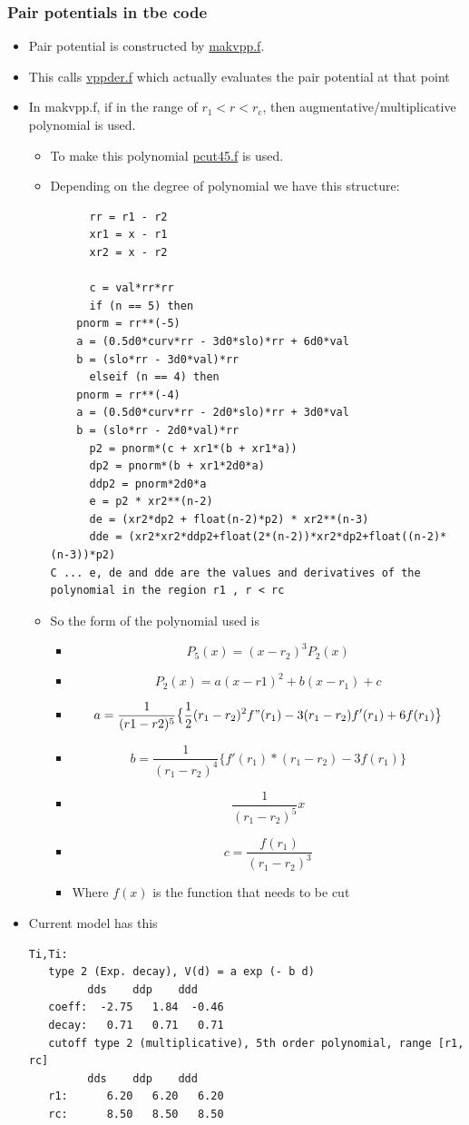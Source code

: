 \documentclass[11pt]{article}
\begin{document}
\subsubsection{Pair potentials in tbe code}
\label{sec-2-2-1}
\begin{itemize}
\item Pair potential is constructed by \href{file:///home/tigany/lm/tb/makvpp.f}{makvpp.f}.
\item This calls \href{file:///home/tigany/lm/tb/vppder.f}{vppder.f} which actually evaluates the pair potential at that
point
\item In makvpp.f, if in the range of $r_1 < r < r_{\text{c}}$, then
augmentative/multiplicative polynomial is used.
\begin{itemize}
\item To make this polynomial \href{file:///home/tigany/lm/tb/pcut45.f}{pcut45.f} is used.
\item Depending on the degree of polynomial we have this structure:
\begin{verbatim}
      rr = r1 - r2
      xr1 = x - r1
      xr2 = x - r2

      c = val*rr*rr
      if (n == 5) then
	pnorm = rr**(-5)
	a = (0.5d0*curv*rr - 3d0*slo)*rr + 6d0*val
	b = (slo*rr - 3d0*val)*rr
      elseif (n == 4) then
	pnorm = rr**(-4)
	a = (0.5d0*curv*rr - 2d0*slo)*rr + 3d0*val
	b = (slo*rr - 2d0*val)*rr
      p2 = pnorm*(c + xr1*(b + xr1*a))
      dp2 = pnorm*(b + xr1*2d0*a)
      ddp2 = pnorm*2d0*a
      e = p2 * xr2**(n-2)
      de = (xr2*dp2 + float(n-2)*p2) * xr2**(n-3)
      dde = (xr2*xr2*ddp2+float(2*(n-2))*xr2*dp2+float((n-2)*(n-3))*p2)
C ... e, de and dde are the values and derivatives of the polynomial in the region r1 , r < rc
\end{verbatim}
\item So the form of the polynomial used is
\begin{itemize}
\item $$ P_5(x) = (x-r_2)^3 P_2(x)  $$
\item \[ P_2(x) = a(x-r1)^2 + b(x-r_1) + c \]
\item \[ a = \frac{1}{ (r1-r2)^5 } \big\{  \frac{1}{2}(r_1-r_2)^2f"(r_1) -3(r_1-r_2)f'(r_1) + 6f(r_1) \big\} \]
\item \[  b = \frac{1}{(r_1-r_2)^4} \big\{ f'(r_1)*(r_1-r_2) - 3f(r_1) \big\}  \]
\item \[ \frac{1}{(r_1 - r_2)^5} x \]
\item \[  c = \frac{ f(r_1) }{ (r_1-r_2)^3} \]
\item Where $f(x)$ is the function that needs to be cut
\end{itemize}
\end{itemize}
\item Current model has this
\begin{verbatim}
Ti,Ti:
   type 2 (Exp. decay), V(d) = a exp (- b d)
	     dds    ddp    ddd
   coeff:  -2.75   1.84  -0.46
   decay:   0.71   0.71   0.71
   cutoff type 2 (multiplicative), 5th order polynomial, range [r1, rc]
	     dds    ddp    ddd
   r1:      6.20   6.20   6.20
   rc:      8.50   8.50   8.50
\end{verbatim}
\end{itemize}
\end{document}
